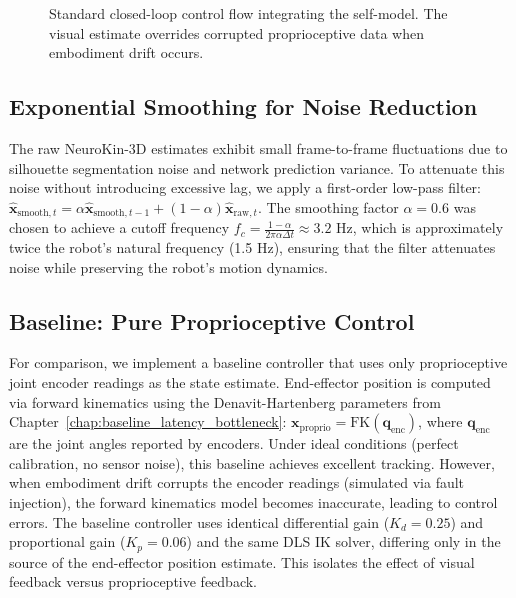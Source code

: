 \documentclass[12pt,a4paper,oneside]{report}
\begin{document}
\begin{figure}[H]
    \centering
    \caption{Standard closed-loop control flow integrating the self-model. The visual estimate overrides corrupted proprioceptive data when embodiment drift occurs.}
    \label{fig:control_loop}
\end{figure}

\subsection{Exponential Smoothing for Noise Reduction}
\label{subsec:exponential_smoothing_for_noise_reduction}

The raw NeuroKin-3D estimates exhibit small frame-to-frame fluctuations due to silhouette segmentation noise and network prediction variance. To attenuate this noise without introducing excessive lag, we apply a first-order low-pass filter: $\hat{\mathbf{x}}_{\text{smooth},t} = \alpha \hat{\mathbf{x}}_{\text{smooth},t-1} + (1 - \alpha) \hat{\mathbf{x}}_{\text{raw},t}$. The smoothing factor $\alpha = 0.6$ was chosen to achieve a cutoff frequency $f_c = \frac{1-\alpha}{2\pi \alpha \Delta t} \approx 3.2$ Hz, which is approximately twice the robot's natural frequency (1.5 Hz), ensuring that the filter attenuates noise while preserving the robot's motion dynamics.

\subsection{Baseline: Pure Proprioceptive Control}
\label{subsec:baseline_pure_proprioceptive_control}

For comparison, we implement a baseline controller that uses only proprioceptive joint encoder readings as the state estimate. End-effector position is computed via forward kinematics using the Denavit-Hartenberg parameters from Chapter~\ref{chap:baseline_latency_bottleneck}: $\mathbf{x}_{\text{proprio}} = \text{FK}(\mathbf{q}_{\text{enc}})$, where $\mathbf{q}_{\text{enc}}$ are the joint angles reported by encoders. Under ideal conditions (perfect calibration, no sensor noise), this baseline achieves excellent tracking. However, when embodiment drift corrupts the encoder readings (simulated via fault injection), the forward kinematics model becomes inaccurate, leading to control errors. The baseline controller uses identical differential gain ($K_d = 0.25$) and proportional gain ($K_p = 0.06$) and the same DLS IK solver, differing only in the source of the end-effector position estimate. This isolates the effect of visual feedback versus proprioceptive feedback.
\end{document}
